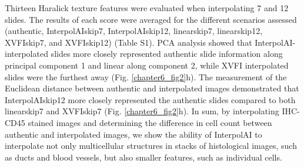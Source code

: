 \begin{refsection}
    Thirteen Haralick texture features were evaluated when interpolating 7 and 12 slides. The results of each score were averaged for the different scenarios assessed (authentic, InterpolAIskip7, InterpolAIskip12, linearskip7, linearskip12, XVFIskip7, and XVFIskip12) (Table S1). PCA analysis showed that InterpolAI-interpolated slides more closely represented authentic slide information along principal component 1 and linear along component 2, while XVFI interpolated slides were the furthest away (Fig. \ref{chapter6_fig2}h). The measurement of the Euclidean distance between authentic and interpolated images demonstrated that InterpolAIskip12 more closely represented the authentic slides compared to both linearskip7 and XVFIskip7 (Fig. \ref{chapter6_fig2}h).
    In sum, by interpolating IHC-CD45 stained images and determining the difference in cell count between authentic and interpolated images, we show the ability of InterpolAI to interpolate not only multicellular structures in stacks of histological images, such as ducts and blood vessels, but also smaller features, such as individual cells. 
    
    
    

\end{refsection}
